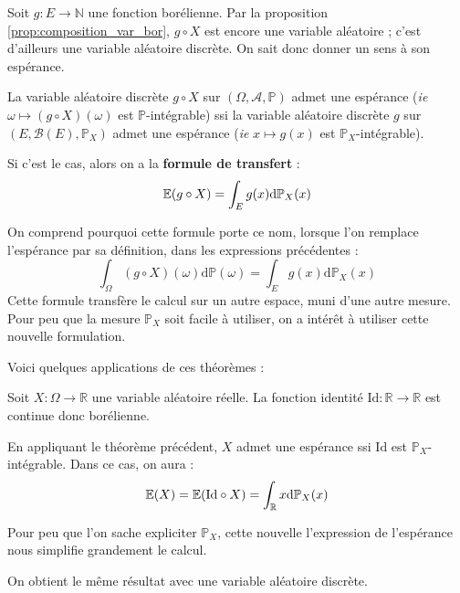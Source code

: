 \documentclass[../integ-proba.tex]{subfiles}
\begin{document}
\begin{thm}
    Soit $g:E \longrightarrow \mathbb{N}$ une fonction borélienne.
    Par la proposition \ref{prop:composition_var_bor}, $g \circ X$ est encore une variable aléatoire ; c'est d'ailleurs une variable aléatoire discrète.
    On sait donc donner un sens à son espérance.

    La variable aléatoire discrète $g \circ X$ sur $\left(\Omega, \mathcal{A}, \mathbb{P}\right)$ admet une espérance (\textit{ie} $\omega \mapsto (g \circ X)(\omega)$ est $\mathbb{P}$-intégrable) ssi la variable aléatoire discrète $g$ sur $\left(E, \mathcal{B}(E), \mathbb{P}_X\right)$ admet une espérance (\textit{ie} $x \mapsto g(x)$ est $\mathbb{P}_X$-intégrable).
    
    Si c'est le cas, alors on a la \textbf{formule de transfert} :
    $$
    \mathbb{E}(g \circ X) = \int_E g(x)\textnormal{d}\mathbb{P}_X(x)
    $$
\end{thm}

\begin{rem}
    On comprend pourquoi cette formule porte ce nom, lorsque l'on remplace l'espérance par sa définition, dans les expressions précédentes :
    $$
    \int_\Omega (g \circ X)(\omega) \text{d} \mathbb{P}(\omega) = \int_E g(x) \text{d} \mathbb{P}_X(x)
    $$
    Cette formule transfère le calcul sur un autre espace, muni d'une autre mesure.
    Pour peu que la mesure $\mathbb{P}_X$ soit facile à utiliser, on a intérêt à utiliser cette nouvelle formulation.
\end{rem}

Voici quelques applications de ces théorèmes :

\begin{exemple}
    Soit $X:\Omega \longrightarrow \mathbb{R}$ une variable aléatoire réelle.
    La fonction identité $\text{Id}:\mathbb{R} \longrightarrow \mathbb{R}$ est continue donc borélienne.

    En appliquant le théorème précédent, $X$ admet une espérance ssi $\text{Id}$ est $\mathbb{P}_X$-intégrable.
    Dans ce cas, on aura :
    $$
    \mathbb{E}(X) = \mathbb{E}(\text{Id} \circ X) = \int_\mathbb{R} x\textnormal{d}\mathbb{P}_X(x)
    $$

    Pour peu que l'on sache expliciter $\mathbb{P}_X$, cette nouvelle l'expression de l'espérance nous simplifie grandement le calcul.
\end{exemple}

\begin{exemple}
    On obtient le même résultat avec une variable aléatoire discrète.
\end{exemple}
\end{document}

